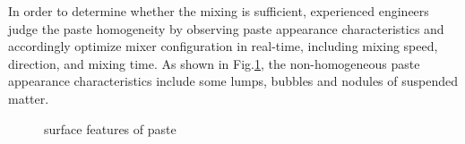 \documentclass[pdflatex,sn-mathphys]{sn-jnl}%
\theoremstyle{thmstyleone}%
\theoremstyle{thmstyletwo}%
\theoremstyle{thmstylethree}%
\begin{document}
In order to determine whether the mixing is sufficient, experienced engineers judge the paste homogeneity by observing paste appearance characteristics and accordingly optimize mixer configuration in real-time, including mixing speed, direction, and mixing time\cite{min11121362, LI2022129007, MixingTime}. As shown in Fig.\ref{fig:surface_features}, the non-homogeneous paste appearance characteristics include some lumps, bubbles and nodules of suspended matter.            
\begin{figure}[htb]
    \centering
    \hfill
    \hfill
    \hfill
    \caption{surface features of paste}
    \label{fig:surface_features}
\end{figure}
\end{document}
